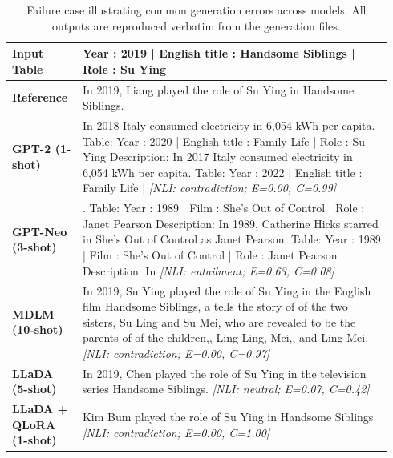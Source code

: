 \begin{table}[t]
\centering
\small
\caption{Failure case illustrating common generation errors across models. All outputs are reproduced verbatim from the generation files.}
\label{tab:failure}
\renewcommand{\arraystretch}{1.18}
\begin{tabular}{p{0.17\linewidth} p{0.77\linewidth}}
\toprule
\textbf{Input Table} & Year : 2019 | English title : Handsome Siblings | Role : Su Ying \\
\midrule
\textbf{Reference} & In 2019, Liang played the role of Su Ying in Handsome Siblings. \\
\midrule
\textbf{GPT-2 (1-shot)} & In 2018 Italy consumed electricity in 6,054 kWh per capita. Table: Year : 2020 | English title : Family Life | Role : Su Ying Description: In 2017 Italy consumed electricity in 6,054 kWh per capita. Table: Year : 2022 | English title : Family Life | \textit{\footnotesize [NLI: contradiction; E=0.00, C=0.99]} \\
\midrule
\textbf{GPT-Neo (3-shot)} & . Table: Year : 1989 | Film : She's Out of Control | Role : Janet Pearson Description: In 1989, Catherine Hicks starred in She's Out of Control as Janet Pearson. Table: Year : 1989 | Film : She's Out of Control | Role : Janet Pearson Description: In \textit{\footnotesize [NLI: entailment; E=0.63, C=0.08]} \\
\midrule
\textbf{MDLM (10-shot)} & In 2019, Su Ying played the role of Su Ying in the English film Handsome Siblings, a tells the story of of the two sisters, Su Ling and Su Mei, who are revealed to be the parents of of the children,, Ling Ling, Mei,, and Ling Mei. \textit{\footnotesize [NLI: contradiction; E=0.00, C=0.97]} \\
\midrule
\textbf{LLaDA (5-shot)} & In 2019, Chen played the role of Su Ying in the television series Handsome Siblings. \textit{\footnotesize [NLI: neutral; E=0.07, C=0.42]} \\
\midrule
\textbf{LLaDA + QLoRA (1-shot)} & Kim Bum played the role of Su Ying in Handsome Siblings \textit{\footnotesize [NLI: contradiction; E=0.00, C=1.00]} \\
\bottomrule
\end{tabular}
\end{table}